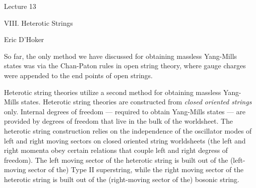\def\gr#1{{\fam\eufmfam\relax#1}}

\def\grA{{\gr A}}	\def\gra{{\gr a}}
\def\grB{{\gr B}}	\def\grb{{\gr b}}
\def\grC{{\gr C}}	\def\grc{{\gr c}}
\def\grD{{\gr D}}	\def\grd{{\gr d}}
\def\grE{{\gr E}}	\def\gre{{\gr e}}
\def\grF{{\gr F}}	\def\grf{{\gr f}}
\def\grG{{\gr G}}	\def\grg{{\gr g}}
\def\grH{{\gr H}}	\def\grh{{\gr h}}
\def\grI{{\gr I}}	\def\gri{{\gr i}}
\def\grJ{{\gr J}}	\def\grj{{\gr j}}
\def\grK{{\gr K}}	\def\grk{{\gr k}}
\def\grL{{\gr L}}	\def\grl{{\gr l}}
\def\grM{{\gr M}}	\def\grm{{\gr m}}
\def\grN{{\gr N}}	\def\grn{{\gr n}}
\def\grO{{\gr O}}	\def\gro{{\gr o}}
\def\grP{{\gr P}}	\def\grp{{\gr p}}
\def\grQ{{\gr Q}}	\def\grq{{\gr q}}
\def\grR{{\gr R}}	\def\grr{{\gr r}}
\def\grS{{\gr S}}	\def\grs{{\gr s}}
\def\grT{{\gr T}}	\def\grt{{\gr t}}
\def\grU{{\gr U}}	\def\gru{{\gr u}}
\def\grV{{\gr V}}	\def\grv{{\gr v}}
\def\grW{{\gr W}}	\def\grw{{\gr w}}
\def\grX{{\gr X}}	\def\grx{{\gr x}}
\def\grY{{\gr Y}}	\def\gry{{\gr y}}
\def\grZ{{\gr Z}}	\def\grz{{\gr z}}

\overfullrule=0pt

\parindent=25pt

\bigskip\bigskip
\centerline{\boldtitlefont Lecture 13}
\bigskip
\centerline{\smallboldtitle VIII. Heterotic Strings}

\medskip
\centerline{Eric D'Hoker}

\frenchspacing

\dspace
\bigskip
So far, the only method we have discussed for
obtaining massless Yang-Mills states was via the
Chan-Paton rules in open string theory, where gauge
charges were appended to the end points of open
strings.

Heterotic string theories utilize a second method for
obtaining massless Yang-Mills states.
Heterotic string theories are constructed from {\it
closed oriented strings} only. 
Internal degrees of
freedom --- required to obtain Yang-Mills states ---
are provided by degrees of freedom that live in the
bulk of the worldsheet.
The heterotic string construction relies
on the independence of the
oscillator modes of left and right moving sectors on
closed oriented string worldsheets (the
left and right momenta obey certain relations that couple
left and right degress of freedom). 
The left moving sector of the heterotic string is
built out of the (left-moving sector of the) Type II
superstring, while the right moving sector of the
heterotic string is built out of the (right-moving
sector of the) bosonic string.

